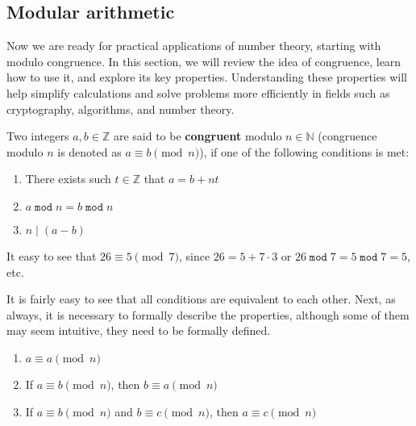 \documentclass[../lecture-notes-148x210.tex]{subfiles}
\begin{document}
\subsection{Modular arithmetic}

Now we are ready for practical applications of number theory, starting with modulo congruence.
In this section, we will review the idea of congruence, learn how to use it, and explore
its key properties. Understanding these properties will help simplify calculations and solve 
problems more efficiently in fields such as cryptography, algorithms, and number theory.

\begin{definition}
    Two integers $a, b \in \mathbb{Z}$ are said to be \textbf{congruent} modulo $n \in \mathbb{N}$ (congruence modulo $n$ is denoted as $a \equiv b \pmod{n}$), if one of the following conditions is met:
    \begin{enumerate}
        \item There exists such $t \in \mathbb{Z}$ that $a = b + nt$
        \item $a \; \texttt{mod} \; n = b \; \texttt{mod} \; n$
        \item $n \mid (a - b)$
    \end{enumerate}
\end{definition}

\begin{example}
    It easy to see that $26 \equiv 5 \pmod{7}$, since $26 = 5 + 7 \cdot 3$ 
    or $26 \; \texttt{mod} \; 7 = 5 \; \texttt{mod} \; 7 = 5$, etc.
\end{example}

It is fairly easy to see that all conditions are equivalent to each other. Next, as always, it is necessary to formally describe the properties, although some of them may seem intuitive, they need to be formally defined.

\begin{lemma} 
    \hfill
    \begin{enumerate}
        \item $a \equiv a \pmod{n}$
        \item If $a \equiv b \pmod{n}$, then $b \equiv a \pmod{n}$
        \item If $a \equiv b \pmod{n}$ and $b \equiv c \pmod{n}$, then $a \equiv c \pmod{n}$
    \end{enumerate}
\end{lemma}
\end{document}
